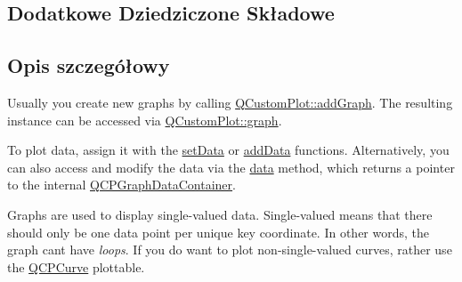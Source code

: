 \subsection*{Dodatkowe Dziedziczone Składowe}


\subsection{Opis szczegółowy}


Usually you create new graphs by calling \hyperlink{class_q_custom_plot_a6fb2873d35a8a8089842d81a70a54167}{Q\+Custom\+Plot\+::add\+Graph}. The resulting instance can be accessed via \hyperlink{class_q_custom_plot_a6d3ed93c2bf46ab7fa670d66be4cddaf}{Q\+Custom\+Plot\+::graph}.

To plot data, assign it with the \hyperlink{class_q_c_p_graph_a1eae9429a316b008e2d99b2d65a54395}{set\+Data} or \hyperlink{class_q_c_p_graph_ae0555c0d3fe0fa7cb8628f88158d420f}{add\+Data} functions. Alternatively, you can also access and modify the data via the \hyperlink{class_q_c_p_graph_a04514a2b1fb61a280ead66abe80b89ab}{data} method, which returns a pointer to the internal \hyperlink{qcustomplot_8hh_a2e5583d1ae212f0deb10537cf975a15a}{Q\+C\+P\+Graph\+Data\+Container}.

Graphs are used to display single-\/valued data. Single-\/valued means that there should only be one data point per unique key coordinate. In other words, the graph can\textquotesingle{}t have {\itshape loops}. If you do want to plot non-\/single-\/valued curves, rather use the \hyperlink{class_q_c_p_curve}{Q\+C\+P\+Curve} plottable.

